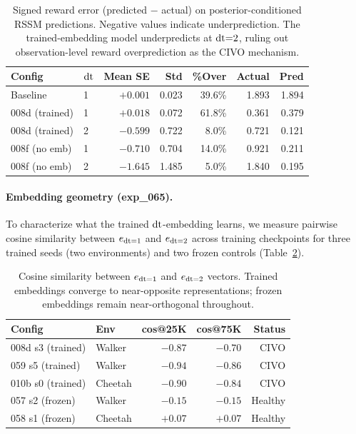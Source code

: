 \begin{table}[h]
\centering
\caption{Signed reward error (predicted $-$ actual) on posterior-conditioned RSSM predictions. Negative values indicate underprediction. The trained-embedding model underpredicts at $\mathrm{dt}{=}2$, ruling out observation-level reward overprediction as the CIVO mechanism.}
\label{tab:signed_error}
\footnotesize
\setlength{\tabcolsep}{4pt}
\begin{tabular}{llrrrrr}
\toprule
\textbf{Config} & $\mathrm{dt}$ & \textbf{Mean SE} & \textbf{Std} & \textbf{\%Over} & \textbf{Actual} & \textbf{Pred} \\
\midrule
Baseline & 1 & $+0.001$ & 0.023 & 39.6\% & 1.893 & 1.894 \\
\midrule
008d (trained) & 1 & $+0.018$ & 0.072 & 61.8\% & 0.361 & 0.379 \\
008d (trained) & 2 & $\mathbf{-0.599}$ & 0.722 & 8.0\% & 0.721 & 0.121 \\
\midrule
008f (no emb) & 1 & $-0.710$ & 0.704 & 14.0\% & 0.921 & 0.211 \\
008f (no emb) & 2 & $-1.645$ & 1.485 & 5.0\% & 1.840 & 0.195 \\
\bottomrule
\end{tabular}
\end{table}

\paragraph{Embedding geometry (exp\_065).}
To characterize what the trained $\mathrm{dt}$-embedding learns, we measure pairwise cosine similarity between $e_{\mathrm{dt}{=}1}$ and $e_{\mathrm{dt}{=}2}$ across training checkpoints for three trained seeds (two environments) and two frozen controls (Table~\ref{tab:cosine_sim}).

\begin{table}[h]
\centering
\caption{Cosine similarity between $e_{\mathrm{dt}{=}1}$ and $e_{\mathrm{dt}{=}2}$ vectors. Trained embeddings converge to near-opposite representations; frozen embeddings remain near-orthogonal throughout.}
\label{tab:cosine_sim}
\footnotesize
\setlength{\tabcolsep}{4pt}
\begin{tabular}{llrrr}
\toprule
\textbf{Config} & \textbf{Env} & \textbf{cos@25K} & \textbf{cos@75K} & \textbf{Status} \\
\midrule
008d s3 (trained) & Walker & $-0.87$ & $-0.70$ & CIVO \\
059 s5 (trained) & Walker & $-0.94$ & $-0.86$ & CIVO \\
010b s0 (trained) & Cheetah & $-0.90$ & $-0.84$ & CIVO \\
\midrule
057 s2 (frozen) & Walker & $-0.15$ & $-0.15$ & Healthy \\
058 s1 (frozen) & Cheetah & $+0.07$ & $+0.07$ & Healthy \\
\bottomrule
\end{tabular}
\end{table}

